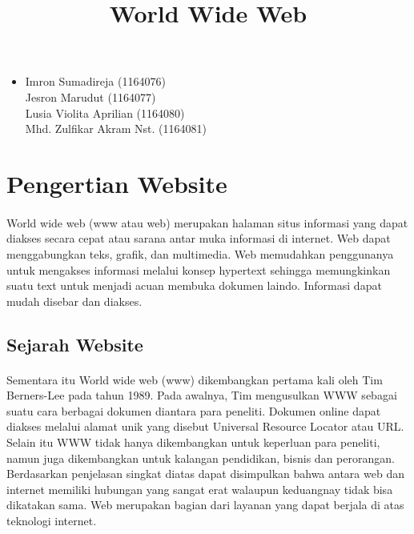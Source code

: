 \documentclass[12pt, a4paper]{article}
\begin{document}
\title{World Wide Web}
\maketitle

\begin{itemize}
\item
	Imron Sumadireja (1164076) \\
	Jesron Marudut (1164077) \\
	Lusia Violita Aprilian (1164080) \\
	Mhd. Zulfikar Akram Nst. (1164081) \\
\end{itemize}

\section{Pengertian Website}
\paragraph{}World wide web (www atau web) merupakan halaman situs informasi yang dapat diakses secara cepat atau sarana
antar muka informasi di internet. Web dapat menggabungkan teks, grafik, dan multimedia. Web memudahkan
penggunanya untuk mengakses informasi melalui konsep hypertext sehingga memungkinkan  suatu text untuk
menjadi acuan membuka dokumen laindo. Informasi dapat mudah disebar dan diakses.

\subsection{Sejarah Website}
\paragraph{}Sementara itu World wide web (www) dikembangkan pertama kali oleh Tim Berners-Lee pada tahun 1989. Pada
awalnya, Tim mengusulkan WWW sebagai suatu cara berbagai dokumen diantara para peneliti. Dokumen online dapat
diakses melalui alamat unik yang disebut Universal Resource Locator atau URL. Selain itu WWW tidak hanya
dikembangkan untuk keperluan para peneliti, namun juga dikembangkan untuk kalangan pendidikan, bisnis dan
perorangan. Berdasarkan penjelasan singkat diatas dapat disimpulkan bahwa antara web dan internet memiliki
hubungan yang sangat erat walaupun keduangnay tidak bisa dikatakan sama. Web merupakan bagian dari layanan
yang dapat berjala di atas teknologi internet.
\end{document}
